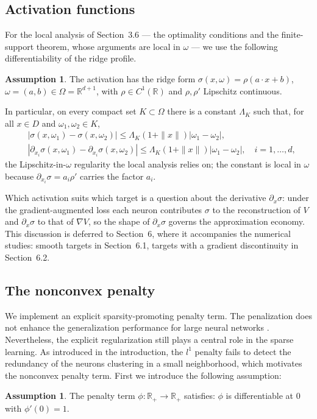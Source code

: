 \documentclass[11pt]{amsart}
\theoremstyle{definition}
\newtheorem{assumption}[theorem]{Assumption}
\theoremstyle{remark}
\begin{document}
\subsection{Activation functions}
For the local analysis of Section~3.6 --- the optimality conditions and the finite-support theorem, whose
arguments are local in $\omega$ --- we use the following differentiability of
the ridge profile.

\begin{assumption}\label{ass:diff_lipschitz}
The activation has the ridge form $\sigma(x,\omega) = \rho(a \cdot x + b)$,
$\omega = (a,b) \in \Omega = \mathbb{R}^{d+1}$, with $\rho \in C^1(\mathbb{R})$
and $\rho, \rho'$ Lipschitz continuous.
\end{assumption}

In particular, on every compact set $K \subset \Omega$ there is a constant
$\Lambda_K$ such that, for all $x \in D$ and $\omega_1, \omega_2 \in K$,
\begin{align*}
	&|\sigma(x, \omega_1) - \sigma(x, \omega_2)| \le \Lambda_K (1 + \|x\|)|\omega_1 - \omega_2|,\\
	&|\partial_{x_i}\sigma(x, \omega_1) - \partial_{x_i}\sigma(x, \omega_2)| \le \Lambda_K (1 + \|x\|)|\omega_1 - \omega_2|, \quad i = 1, \dots, d,
\end{align*}
the Lipschitz-in-$\omega$ regularity the local analysis relies on; the constant
is local in $\omega$ because $\partial_{x_i}\sigma = a_i \rho'$ carries the
factor $a_i$.

Which activation suits which target is a question about the derivative
$\partial_x \sigma$: under the gradient-augmented loss each neuron contributes
$\sigma$ to the reconstruction of $V$ and $\partial_x \sigma$ to that of
$\nabla V$, so the shape of $\partial_x\sigma$ governs the approximation
economy. This discussion is deferred to Section~6, where it accompanies the
numerical studies: smooth targets in Section~6.1, targets with a gradient
discontinuity in Section~6.2.


\subsection{The nonconvex penalty}
We implement an explicit sparsity-promoting penalty term. 
The penalization does not enhance the generalization performance for large neural networks \cite{zhang2021understanding}. 
Nevertheless, the explicit regularization still plays a central role in the sparse learning. 
As introduced in the introduction, the $l^1$ penalty fails to detect the redundancy of the neurons clustering in a small neighborhood, which motivates the nonconvex penalty term. First we introduce the following assumption:
\begin{assumption} \label{pen1}
	The penalty term $\phi: \mathbb{R}_+ \rightarrow \mathbb{R}_+$ satisfies: $\phi$ is differentiable at 0 with $\phi'(0) = 1$. 
\end{assumption}
\end{document}
